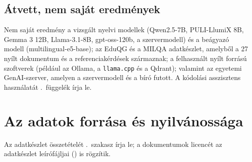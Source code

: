   

\section{Átvett, nem saját eredmények}

Nem saját eredmény a vizsgált nyelvi modellek (Qwen2.5-7B, PULI-LlumiX 8B, Gemma 3 12B, Llama-3.1-8B,
gpt-oss-120b, a szervermodell) és a beágyazó modell (multilingual-e5-base); az EduQG és a MILQA adatkészlet,
amelyből a 27 nyílt dokumentum és a referenciakérdések származnak; a felhasznált nyílt forrású szoftverek
(például az Ollama, a \texttt{llama.cpp} és a Qdrant); valamint az egyetemi GenAI-szerver, amelyen a
szervermodell és a bíró futott. A kódolási asszisztens használatát \az{\ref{app-mi-nyilatkozat}}.~függelék írja
le.

\chapter{Az adatok forrása és nyilvánossága}
\label{app-adatok}

Az adatkészlet összetételét \az{\ref{sec:adatkeszlet}}.~szakasz írja le; a dokumentumok licencét az
adatkészlet leírófájljai () is rögzítik.

